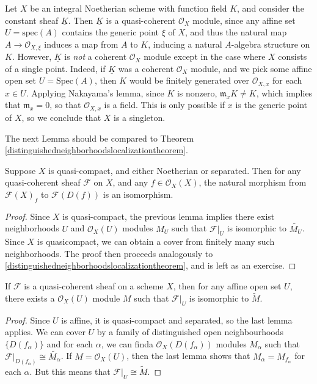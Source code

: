 \begin{example}
    Let $X$ be an integral Noetherian scheme with function field $K$, and consider the constant sheaf $\underline{K}$. Then $\underline{K}$ is a quasi-coherent $\mathcal{O}_X$ module, since any affine set $U = \text{spec}(A)$ contains the generic point $\xi$ of $X$, and thus the natural map $A \to \mathcal{O}_{X,\xi}$ induces a map from $A$ to $K$, inducing a natural $A$-algebra structure on $K$. However, $\underline{K}$ is \emph{not} a coherent $\mathcal{O}_X$ module except in the case where $X$ consists of a single point. Indeed, if $\underline{K}$ was a coherent $\mathcal{O}_X$ module, and we pick some affine open set $U = \text{Spec}(A)$, then $K$ would be finitely generated over $\mathcal{O}_{X,x}$ for each $x \in U$. Applying Nakayama's lemma, since $K$ is nonzero, $\mathfrak{m}_x K \neq K$, which implies that $\mathfrak{m}_x = 0$, so that $\mathcal{O}_{X,x}$ is a field. This is only possible if $x$ is the generic point of $X$, so we conclude that $X$ is a singleton.
\end{example}

The next Lemma should be compared to Theorem \ref{distinguishedneighborhoodslocalizationtheorem}.

\begin{lemma}
    Suppose $X$ is quasi-compact, and either Noetherian or separated. Then for any quasi-coherent sheaf $\mathcal{F}$ on $X$, and any $f \in \mathcal{O}_X(X)$, the natural morphism from $\mathcal{F}(X)_f$ to $\mathcal{F}(D(f))$ is an isomorphism.
\end{lemma}
\begin{proof}
    Since $X$ is quasi-compact, the previous lemma implies there exist neighborhoods $U$ and $\mathcal{O}_X(U)$ modules $M_U$ such that $\mathcal{F}|_U$ is isomorphic to $\widetilde{M_U}$. Since $X$ is quasicompact, we can obtain a cover from finitely many such neighborhoods. The proof then proceeds analogously to \ref{distinguishedneighborhoodslocalizationtheorem}, and is left as an exercise.
\end{proof}

\begin{corollary}
    If $\mathcal{F}$ is a quasi-coherent sheaf on a scheme $X$, then for any affine open set $U$, there exists a $\mathcal{O}_X(U)$ module $M$ such that $\mathcal{F}|_U$ is isomorphic to $\widetilde{M}$.
\end{corollary}
\begin{proof}
    Since $U$ is affine, it is quasi-compact and separated, so the last lemma applies. We can cover $U$ by a family of distinguished open neighbourhoods $\{ D(f_\alpha) \}$ and for each $\alpha$, we can finda $\mathcal{O}_X(D(f_\alpha))$ modules $M_\alpha$ such that $\mathcal{F}|_{D(f_\alpha)} \cong \widetilde{M_\alpha}$. If $M = \mathcal{O}_X(U)$, then the last lemma shows that $M_\alpha = M_{f_\alpha}$ for each $\alpha$. But this means that $\mathcal{F}|_U \cong \widetilde{M}$.
\end{proof}

